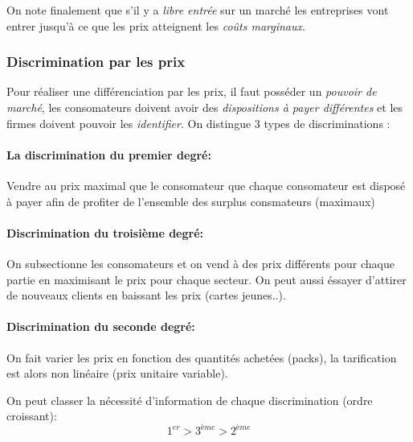 On note finalement que s'il y a \emph{libre entrée} sur un marché 
les entreprises vont entrer jusqu'à ce que les prix atteignent les \emph{coûts marginaux}.

\subsubsection{Discrimination par les prix} %
\label{sub:discrimination_par_les_prix}
 Pour réaliser une différenciation par les prix, il faut posséder un \emph{pouvoir de marché},
 les consomateurs doivent avoir des \emph{dispositions à payer différentes} 
 et les firmes doivent pouvoir les \emph{identifier}. 
 On distingue 3 types de discriminations : 
 
 \paragraph{La discrimination du premier degré:} %
 \label{par:la_discrimination_du_premier_degre}
 Vendre au prix maximal que le consomateur que chaque consomateur est disposé 
 à payer afin de profiter de l'ensemble des surplus consmateurs (maximaux) 
 
 
 \paragraph{Discrimination du troisième degré:} %
 \label{par:discrimination_du_troisieme_degre}
 On subsectionne les consomateurs et on vend à des prix différents pour chaque partie 
 en maximisant le prix pour chaque secteur. On peut aussi éssayer d'attirer de nouveaux 
 clients en baissant les prix (cartes jeunes..).
 
 \paragraph{Discrimination du seconde degré:} %
 \label{par:discrimination_du_seconde_degre}
 On fait varier les prix en fonction des quantités achetées (packs), 
 la tarification est alors non linéaire (prix unitaire variable).
 


On peut classer la nécessité d'information de chaque discrimination (ordre croissant):
\[
	1^{er} > 3^{ème} > 2^{ème}
\]

